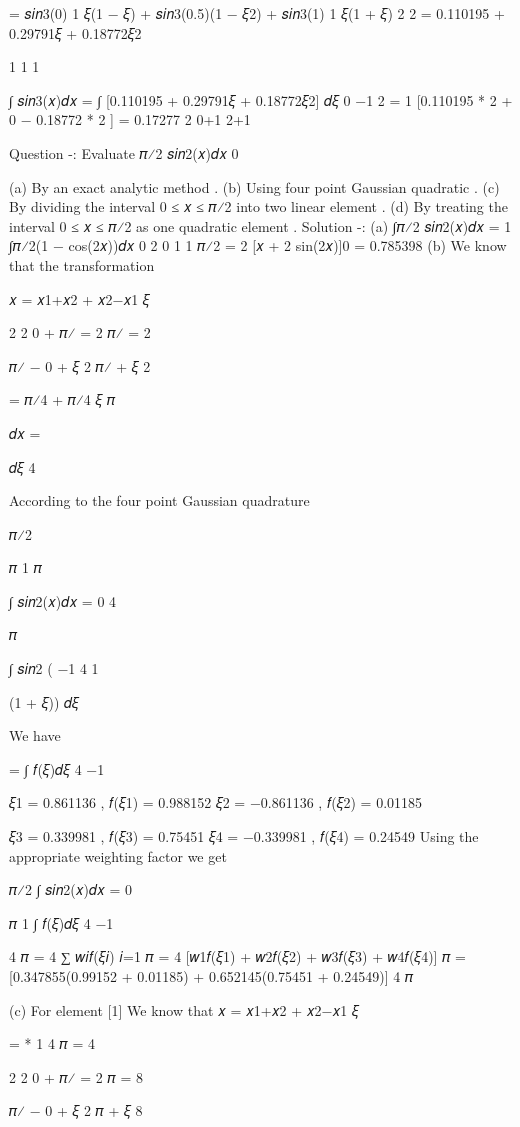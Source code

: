 {{{{{{= 𝑠𝑖𝑛3(0) 1 𝜉(1 − 𝜉) + 𝑠𝑖𝑛3(0.5)(1 − 𝜉2) + 𝑠𝑖𝑛3(1) 1 𝜉(1 + 𝜉)
2	2
= 0.110195 + 0.29791𝜉 + 0.18772𝜉2


1	1	1
 
∫ 𝑠𝑖𝑛3(𝑥)𝑑𝑥 = ∫ [0.110195 + 0.29791𝜉 + 0.18772𝜉2]   𝑑𝜉
0	−1	2
= 1 [0.110195 *  2  + 0 − 0.18772 *  2 ]  = 0.17277
2	0+1	2+1
 
Question -: Evaluate	𝜋⁄2 𝑠𝑖𝑛2(𝑥)𝑑𝑥
0

(a)	By an exact analytic method .
(b)	Using four point Gaussian quadratic .
(c)	By dividing the interval 0 ≤ 𝑥 ≤ 𝜋⁄2 into two linear element .
(d)	By treating the interval 0 ≤ 𝑥 ≤ 𝜋⁄2 as one quadratic element .
Solution -:
(a)	∫𝜋⁄2 𝑠𝑖𝑛2(𝑥)𝑑𝑥 = 1 ∫𝜋⁄2(1 − cos(2𝑥))𝑑𝑥
0	2 0
1	1	𝜋⁄2
= 2 [𝑥 + 2 sin(2𝑥)]0
= 0.785398
(b)	We know that the transformation

𝑥 = 𝑥1+𝑥2 + 𝑥2−𝑥1 𝜉
 
2	2
0 + 𝜋⁄
=
2
𝜋⁄
=
2
 

𝜋⁄ − 0
+	𝜉
2
𝜋⁄
+	𝜉
2
 
= 𝜋⁄4 + 𝜋⁄4 𝜉
𝜋
 
𝑑𝑥 =
 
  𝑑𝜉 4
 
According to the four point Gaussian quadrature

 
𝜋⁄2
 
𝜋	1	𝜋
 
∫	𝑠𝑖𝑛2(𝑥)𝑑𝑥 =
0	4

𝜋
 
∫ 𝑠𝑖𝑛2 (
−1	4
1
 
(1 + 𝜉)) 𝑑𝜉
 


We have
 
=   ∫ 𝑓(𝜉)𝑑𝜉
4 −1
 
𝜉1 = 0.861136 ,	𝑓(𝜉1) = 0.988152
𝜉2 = −0.861136 ,	𝑓(𝜉2) = 0.01185
 
𝜉3 = 0.339981 ,	𝑓(𝜉3) = 0.75451
𝜉4 = −0.339981 ,	𝑓(𝜉4) = 0.24549
Using the appropriate weighting factor we get

 
𝜋⁄2
∫	𝑠𝑖𝑛2(𝑥)𝑑𝑥 =
0
 
𝜋	1
  ∫ 𝑓(𝜉)𝑑𝜉
4 −1
 
4
𝜋
= 4 ∑ 𝑤𝑖𝑓(𝜉𝑖)
𝑖=1
𝜋
= 4 [𝑤1𝑓(𝜉1) + 𝑤2𝑓(𝜉2) + 𝑤3𝑓(𝜉3) + 𝑤4𝑓(𝜉4)]
𝜋
=   [0.347855(0.99152 + 0.01185) + 0.652145(0.75451 + 0.24549)]
4
𝜋
 




(c)	For element [1] We know that
𝑥 = 𝑥1+𝑥2 + 𝑥2−𝑥1 𝜉
 
=   * 1
4
𝜋
=  
4
 
2	2
0 + 𝜋⁄
=
2
𝜋
=
8
 

𝜋⁄ − 0
+	𝜉
2
𝜋
+   𝜉 8
 



}}}}}}
